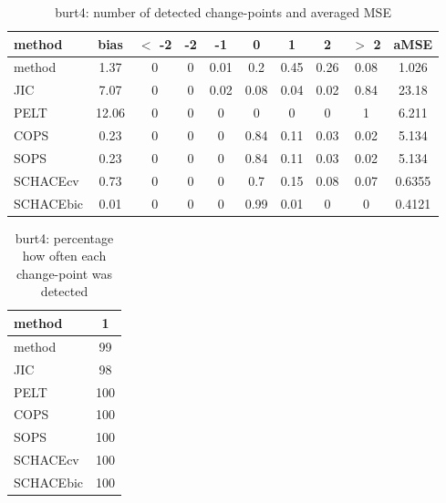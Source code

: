 \begin{table}[ht]
\centering
\begin{tabular}{l|c|ccccccc|c}
  \hline
method & bias & $<$ -2 & -2 & -1 & 0 & 1 & 2 & $>$ 2 & aMSE \\ 
  \hline
method &  1.37 &     0 &     0 &  0.01 &   0.2 &  0.45 &  0.26 &  0.08 & 1.026 \\ 
  JIC &  7.07 &     0 &     0 &  0.02 &  0.08 &  0.04 &  0.02 &  0.84 & 23.18 \\ 
  PELT & 12.06 &     0 &     0 &     0 &     0 &     0 &     0 &     1 & 6.211 \\ 
  COPS &  0.23 &     0 &     0 &     0 &  0.84 &  0.11 &  0.03 &  0.02 & 5.134 \\ 
  SOPS &  0.23 &     0 &     0 &     0 &  0.84 &  0.11 &  0.03 &  0.02 & 5.134 \\ 
  SCHACEcv &  0.73 &     0 &     0 &     0 &   0.7 &  0.15 &  0.08 &  0.07 & 0.6355 \\ 
  SCHACEbic &  0.01 &     0 &     0 &     0 &  0.99 &  0.01 &     0 &     0 & 0.4121 \\ 
   \hline
\end{tabular}
\caption{burt4: number of detected change-points and averaged MSE} 
\label{tab:burt4Njumps}
\end{table}
\begin{table}[ht]
\centering
\begin{tabular}{l|c}
  \hline
method & 1 \\ 
  \hline
method &     99 \\ 
  JIC &     98 \\ 
  PELT &    100 \\ 
  COPS &    100 \\ 
  SOPS &    100 \\ 
  SCHACEcv &    100 \\ 
  SCHACEbic &    100 \\ 
   \hline
\end{tabular}
\caption{burt4: percentage how often each change-point was detected} 
\label{tab:burt4Detections}
\end{table}
